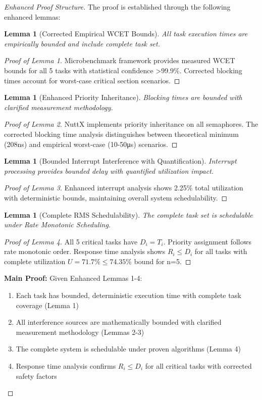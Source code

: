 \documentclass[11pt,a4paper]{article}
\newtheorem{lemma}[theorem]{Lemma}
\theoremstyle{definition}
\theoremstyle{remark}
\begin{document}
\begin{proof}[Enhanced Proof Structure]
The proof is established through the following enhanced lemmas:

\begin{lemma}[Corrected Empirical WCET Bounds]
All task execution times are empirically bounded and include complete task set.
\end{lemma}

\begin{proof}[Proof of Lemma 1]
Microbenchmark framework provides measured WCET bounds for all 5 tasks with statistical confidence >99.9\%. Corrected blocking times account for worst-case critical section scenarios.
\end{proof}

\begin{lemma}[Enhanced Priority Inheritance]
Blocking times are bounded with clarified measurement methodology.
\end{lemma}

\begin{proof}[Proof of Lemma 2]
NuttX implements priority inheritance on all semaphores. The corrected blocking time analysis distinguishes between theoretical minimum (208ns) and empirical worst-case (10-50μs) scenarios.
\end{proof}

\begin{lemma}[Bounded Interrupt Interference with Quantification]
Interrupt processing provides bounded delay with quantified utilization impact.
\end{lemma}

\begin{proof}[Proof of Lemma 3]
Enhanced interrupt analysis shows 2.25\% total utilization with deterministic bounds, maintaining overall system schedulability.
\end{proof}

\begin{lemma}[Complete RMS Schedulability]
The complete task set is schedulable under Rate Monotonic Scheduling.
\end{lemma}

\begin{proof}[Proof of Lemma 4]
All 5 critical tasks have $D_i = T_i$. Priority assignment follows rate monotonic order. Response time analysis shows $R_i \leq D_i$ for all tasks with complete utilization $U = 71.7\% \leq 74.35\%$ bound for n=5.
\end{proof}

\textbf{Main Proof:}
Given Enhanced Lemmas 1-4:
\begin{enumerate}
    \item Each task has bounded, deterministic execution time with complete task coverage (Lemma 1)
    \item All interference sources are mathematically bounded with clarified measurement methodology (Lemmas 2-3)
    \item The complete system is schedulable under proven algorithms (Lemma 4)
    \item Response time analysis confirms $R_i \leq D_i$ for all critical tasks with corrected safety factors
\end{enumerate}


\end{proof}
\end{document}
